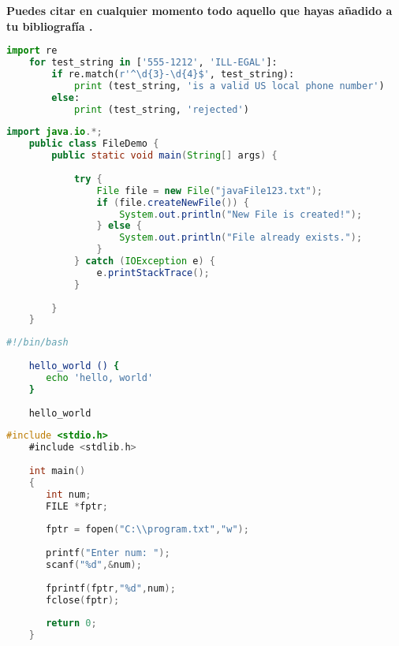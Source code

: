 \textbf{Puedes citar en cualquier momento todo aquello que hayas añadido a tu bibliografía \cite{ref-1}.}

\pagebreak

\begin{lstlisting}[language=Python]
    import re
    for test_string in ['555-1212', 'ILL-EGAL']:
        if re.match(r'^\d{3}-\d{4}$', test_string):
            print (test_string, 'is a valid US local phone number')
        else:
            print (test_string, 'rejected')
\end{lstlisting}

\begin{lstlisting}[language=Java]
    import java.io.*;  
    public class FileDemo {  
        public static void main(String[] args) {  
      
            try {  
                File file = new File("javaFile123.txt");  
                if (file.createNewFile()) {  
                    System.out.println("New File is created!");  
                } else {  
                    System.out.println("File already exists.");  
                }  
            } catch (IOException e) {  
                e.printStackTrace();  
            }  
      
        }  
    }  
\end{lstlisting}

\begin{lstlisting}[language=Bash]
    #!/bin/bash
    
    hello_world () {
       echo 'hello, world'
    }
    
    hello_world
\end{lstlisting}

\begin{lstlisting}[language=C]
    #include <stdio.h>
    #include <stdlib.h>
    
    int main()
    {
       int num;
       FILE *fptr;
    
       fptr = fopen("C:\\program.txt","w");
    
       printf("Enter num: ");
       scanf("%d",&num);
    
       fprintf(fptr,"%d",num);
       fclose(fptr);
    
       return 0;
    }
\end{lstlisting}
